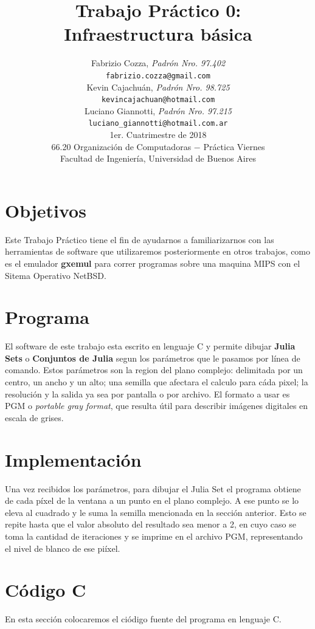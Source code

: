 \documentclass[a4paper,10pt]{article}
\title{		\textbf{Trabajo Pr\'{a}ctico 0: \\
			Infraestructura b\'{a}sica
			}}
\author{	Fabrizio Cozza, \textit{Padr\'{o}n Nro. 97.402}                     \\
            \texttt{ fabrizio.cozza@gmail.com }                                              \\[2.5ex]
            Kevin Cajachu\'{a}n, \textit{Padr\'{o}n Nro. 98.725}                     \\
            \texttt{ kevincajachuan@hotmail.com }                                              \\[2.5ex]
            Luciano Giannotti, \textit{Padr\'{o}n Nro. 97.215}                     \\
            \texttt{luciano\_giannotti@hotmail.com.ar}                                              \\[3.5ex]
	 \newline
            \normalsize{1er. Cuatrimestre de 2018}                                      \\
            \normalsize{66.20 Organizaci\'{o}n de Computadoras  $-$ Pr\'{a}ctica Viernes}  \\
            \normalsize{Facultad de Ingenier\'{i}a, Universidad de Buenos Aires}            \\
       }
\date{}
\begin{document}
\maketitle
\thispagestyle{empty}   %
\newpage

\section{Objetivos}

Este Trabajo Pr\'{a}ctico tiene el fin de ayudarnos a familiarizarnos con las herramientas de software que utilizaremos posteriormente en otros trabajos, como es el emulador \textbf{gxemul} para correr programas sobre una maquina MIPS con el Sitema Operativo NetBSD.


\section{Programa}

El software de este trabajo esta escrito en lenguaje C y permite dibujar \textbf{Julia Sets} o \textbf{Conjuntos de Julia} segun los par\'{a}metros que le pasamos por l\'{i}nea de comando.
Estos parámetros son la region del plano complejo: delimitada por un centro, un ancho y un alto; una semilla que afectara el calculo para c\'{a}da pixel; la resoluci\'{o}n y la salida ya sea por pantalla o por archivo.
El formato a usar es  PGM o \textit{portable gray format}, que resulta \'{u}til para describir im\'{a}genes digitales en escala de grises.


\section{Implementaci\'{o}n}

Una vez recibidos los par\'{a}metros, para dibujar el Julia Set el programa obtiene de cada p\'{i}xel de la ventana a un punto en el plano complejo.
A ese punto se lo eleva al cuadrado y le suma la semilla mencionada en la secci\'{o}n anterior. Esto se repite hasta que el valor absoluto del resultado sea menor a 2, en cuyo caso se toma la cantidad de iteraciones y se imprime en el archivo PGM, representando el nivel de blanco de ese pi\'{i}xel.


\section{C\'{o}digo C}

En esta secci\'{o}n colocaremos el ci\'{o}digo fuente del programa en lenguaje C.
\end{document}
